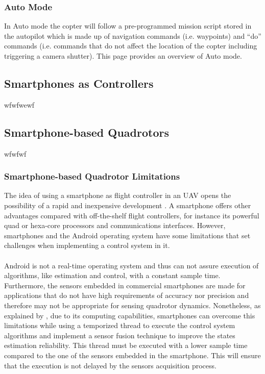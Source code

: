 \subsubsection{Auto Mode}
In Auto mode the copter will follow a pre-programmed mission script stored in the autopilot which is made up of navigation commands (i.e. waypoints) and “do” commands (i.e. commands that do not affect the location of the copter including triggering a camera shutter). This page provides an overview of Auto mode.


\subsection{Smartphones as Controllers}
wfwfwewf

\subsection{Smartphone-based Quadrotors}
wfwfwf

\subsubsection{Smartphone-based Quadrotor Limitations}
The idea of using a smartphone as flight controller in an UAV opens the possibility of a rapid and inexpensive development \cite{Aldrovandi2015}. A smartphone offers other advantages compared with off-the-shelf flight controllers, for instance its powerful quad or hexa-core processors and communications interfaces. However, smartphones and the Android operating system have some limitations that set challenges when implementing a control system in it.\\\\
Android is not a real-time operating system and thus can not assure execution of algorithms, like estimation and control, with a constant sample time. Furthermore, the sensors embedded in commercial smartphones are made for applications that do not have high requirements of accuracy nor precision and therefore may not be appropriate for sensing quadrotor dynamics. Nonetheless, as explained by \cite{Bryant2015}, due to its computing capabilities, smartphones can overcome this limitations while using a temporized thread to execute the control system algorithms and implement a sensor fusion technique to improve the states estimation reliability. This thread must be executed with a lower sample time compared to the one of the sensors embedded in the smartphone. This will ensure that the execution is not delayed by the sensors acquisition process.

